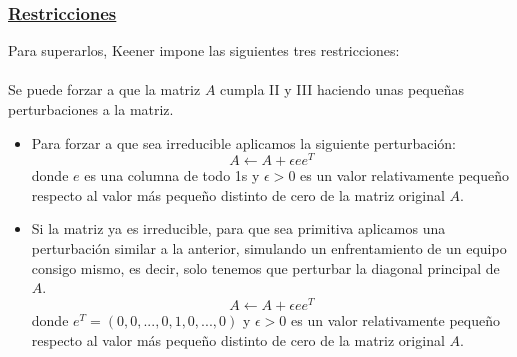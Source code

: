 \subsubsection*{\underline{Restricciones}}
Para superarlos, Keener impone las siguientes tres restricciones:\\
\ \\
Se puede forzar a que la matriz $A$ cumpla II y III haciendo unas pequeñas perturbaciones a la matriz.
\begin{itemize}
	\item Para forzar a que sea irreducible aplicamos la siguiente perturbación:
	\begin{equation*}
	A \leftarrow A + \epsilon e e^{T}
	\end{equation*}
	donde $e$ es una columna de todo 1s y $\epsilon>0$ es un valor relativamente pequeño respecto al valor más pequeño distinto de cero de la matriz original $A$.\\ 
	\item Si la matriz ya es irreducible, para que sea primitiva aplicamos una perturbación similar a la anterior, simulando un enfrentamiento de un equipo consigo mismo, es decir, solo tenemos que perturbar la diagonal principal de $A$.
	\begin{equation*}
	A \leftarrow A + \epsilon e e^{T}
	\end{equation*}
	donde $e^{T} = \left( 0,0,...,0,1,0,...,0 \right) $ y $\epsilon>0$ es un valor relativamente pequeño respecto al valor más pequeño distinto de cero de la matriz original $A$.\\
\end{itemize}

